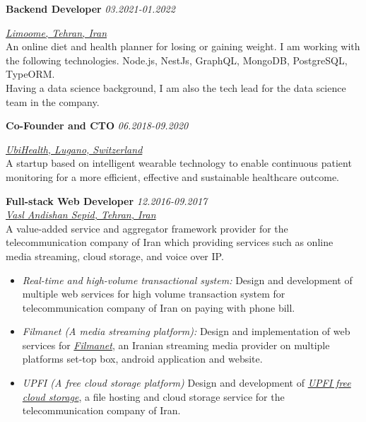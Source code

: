 \documentclass[9pt]{article}
\newenvironment{changemargin}[2]{%
  \begin{list}{}{%
    \setlength{\topsep}{0pt}%
    \setlength{\leftmargin}{#1}%
    \setlength{\rightmargin}{#2}%
    \setlength{\listparindent}{\parindent}%
    \setlength{\itemindent}{\parindent}%
    \setlength{\parsep}{\parskip}%
  }%
  \item[]}{\end{list}
}
\newenvironment{body} {
	\vspace*{-16pt}
	\begin{changemargin}{-0.25in}{-0.5in}
  }	
	{\end{changemargin}
}
\begin{document}
\begin{body}
	\vspace{5pt}

	\textbf{Backend Developer} \hfill \emph{ 03.2021-01.2022}

	\href{https://limoome.com/en/}{\emph{Limoome, Tehran, Iran}} \\

	An online diet and health planner for losing or gaining weight.
	I am working with the following technologies. Node.js, NestJs, GraphQL, MongoDB, PostgreSQL, TypeORM.\\
	Having a data science background, I am also the tech lead for the data science team in the company.\\

	\vspace{5pt}

	\textbf{Co-Founder and CTO} \hfill \emph{ 06.2018-09.2020}

	\href{https://www.startupticker.ch/en/news/july-2018/ubihealth-launches-solution-for-remote-patient-monitoring}{\emph{UbiHealth, Lugano, Switzerland}} \\

	A startup based on intelligent wearable technology to enable continuous patient monitoring for a more efficient, effective and sustainable healthcare outcome.\\

	\vspace{5pt}

	\textbf{Full-stack Web Developer} \hfill \emph{12.2016-09.2017} \\
	\href{http://sepidvas.com/}{\emph{Vasl Andishan Sepid, Tehran, Iran}}\\
	A value-added service and aggregator framework provider for the telecommunication company of Iran which providing services such as online media streaming, cloud storage, and voice over IP.\\

	\begin{itemize}
		\item \emph{Real-time and high-volume transactional system:}
		      Design and development of multiple web services for high volume transaction system for telecommunication company of Iran on paying with phone bill.
		\item \emph{Filmanet (A media streaming platform):} Design and implementation of web services for \href{http://filmanet.ir/}{\emph{Filmanet}}, an Iranian streaming media provider on multiple platforms set-top box, android application and website.
		\item \emph{UPFI (A free cloud storage platform)} Design and development of \href{http://upfi.ir/}{\emph{UPFI free cloud storage}}, a file hosting and cloud storage service for the telecommunication company of Iran.
	\end{itemize}


\end{body}
\end{document}
